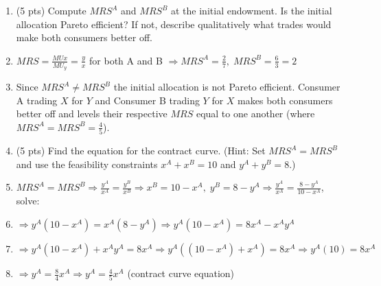\documentclass[11pt]{article}
\begin{document}
\begin{enumerate}[label=(\alph*)]
\begin{center}
    \end{center}
    
    \item (5 pts) Compute $MRS^A$ and $MRS^B$ at the initial endowment. Is the initial allocation Pareto efficient? If not, describe qualitatively what trades would make both consumers better off.
    \item[] $MRS=\frac{MUx}{MU_y}=\frac{y}{x}$ for both A and B $\Rightarrow MRS^A=\frac{2}{7},\; MRS^B=\frac{6}{3}=2$
    \item[] Since $MRS^A\neq MRS^B$ the initial allocation is not Pareto efficient. Consumer A trading $X$ for $Y$ and Consumer B trading $Y$ for $X$ makes both consumers better off and levels their respective $MRS$ equal to one another (where $MRS^A=MRS^B=\frac{4}{5}$).
    
    \item (5 pts) Find the equation for the contract curve. (Hint: Set $MRS^A = MRS^B$ and use the feasibility constraints $x^A + x^B = 10$ and $y^A + y^B = 8$.)
    \item[] $MRS^A=MRS^B\Rightarrow\frac{y^A}{x^A}=\frac{y^B}{x^B}\Rightarrow x^B=10-x^A,\; y^B=8-y^A\Rightarrow\frac{y^A}{x^A}=\frac{8-y^A}{10-x^A}$, solve:
    \item[] $\Rightarrow y^A(10-x^A)=x^A(8-y^A)\Rightarrow y^A(10-x^A)=8x^A-x^Ay^A$
    \item[] $\Rightarrow y^A(10-x^A)+x^Ay^A=8x^A\Rightarrow y^A((10-x^A)+x^A)=8x^A\Rightarrow y^A(10)=8x^A$
    \item[] $\Rightarrow y^A=\frac{8}{4}x^A\Rightarrow y^A=\frac{4}{5}x^A$ (contract curve equation)
    

\end{enumerate}
\end{document}
